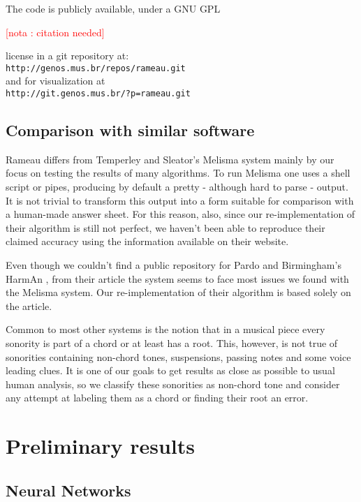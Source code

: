 \documentclass{article}
\newcounter{notacounter}
\newcommand{\nota}[1]{
  \addtocounter{notacounter}{1}
  \textcolor{red}{[nota \arabic{notacounter}: #1]}
}
\begin{document}
The code is publicly available, under a GNU GPL \nota{citation needed}
license in a git \cite{baudis:_git_users_manual} repository
at:\\ \texttt{http://genos.mus.br/repos/rameau.git}\\ and for
visualization at\\ \texttt{http://git.genos.mus.br/?p=rameau.git}

\subsection{Comparison with similar software}
\label{sec:differences-from-similar-software}

Rameau differs from Temperley and Sleator's Melisma
\cite{temperley99:modeling} system mainly by our focus on testing the
results of many algorithms. To run Melisma one uses a shell script or
pipes, producing by default a pretty - although hard to parse -
output. It is not trivial to transform this output into a form
suitable for comparison with a human-made answer sheet. For this
reason, also, since our re-implementation of their algorithm is still
not perfect, we haven't been able to reproduce their claimed accuracy
using the information available on their website.

Even though we couldn't find a public repository for Pardo and
Birmingham's HarmAn \cite{pardo99:automated}, from their article the
system seems to face most issues we found with the Melisma system. Our
re-implementation of their algorithm is based solely on the article.

Common to most other systems is the notion that in a musical piece
every sonority is part of a chord or at least has a root. This,
however, is not true of sonorities containing non-chord tones,
suspensions, passing notes and some voice leading clues. It is one of
our goals to get results as close as possible to usual human analysis,
so we classify these sonorities as non-chord tone and consider any
attempt at labeling them as a chord or finding their root an error.
 
\section{Preliminary results}
\label{sec:analysis-results}

\subsection{Neural Networks}
\label{sec:neural-nets}
\end{document}

